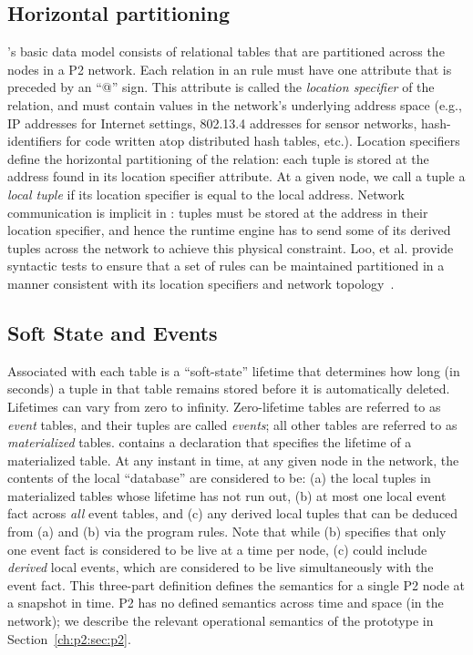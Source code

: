 \subsection{Horizontal partitioning}

\OVERLOG's basic data model consists of relational tables that are partitioned
across the nodes in a P2 network.  Each relation in an \OVERLOG rule must have
one attribute that is preceded by an ``@'' sign.  This attribute is called the
{\em location specifier} of the relation, and must contain values in the
network's underlying address space (e.g., IP addresses for Internet settings,
802.13.4 addresses for sensor networks, hash-identifiers for code written atop
distributed hash tables, etc.).  Location specifiers define the horizontal
partitioning of the relation: each tuple is stored at the address found in its
location specifier attribute.  At a given node, we call a tuple a {\em local
tuple} if its location specifier is equal to the local address.  Network
communication is implicit in \OVERLOG: tuples must be stored at the address in
their location specifier, and hence the runtime engine has to send some of its
derived tuples across the network to achieve this physical constraint.  Loo, et
al.  provide syntactic tests to ensure that a set of rules can be maintained
partitioned in a manner consistent with its location specifiers and network
topology~\cite{loo-sigmod06}.


\subsection{Soft State and Events}

Associated with each \OVERLOG table is a ``soft-state'' lifetime that
determines how long (in seconds) a tuple in that table remains stored before it
is automatically deleted.  Lifetimes can vary from zero to infinity.
Zero-lifetime tables are referred to as {\em event} tables, and their tuples
are called \emph{events}; all other tables are referred to as {\em
materialized} tables.  \OVERLOG contains a  declaration that
specifies the lifetime of a materialized table.  At any instant in time, at any
given node in the network, the contents of the local \OVERLOG ``database'' are
considered to be: (a) the local tuples in materialized tables whose lifetime
has not run out, (b) at most one local event fact across {\em all} event
tables, and (c) any derived local tuples that can be deduced from (a) and (b)
via the program rules.  Note that while (b) specifies that only one event fact
is considered to be live at a time per node, (c) could include {\em derived}
local events, which are considered to be live simultaneously with the event
fact.  This three-part definition defines the semantics for a single P2 node at
a snapshot in time.  P2 has no defined semantics across time and space (in the
network); we describe the relevant operational semantics of the prototype in
Section~\ref{ch:p2:sec:p2}.
     
